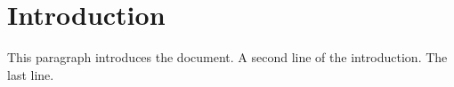 \section{Introduction}
This paragraph introduces the document.
A second line of the introduction.
The last line.
